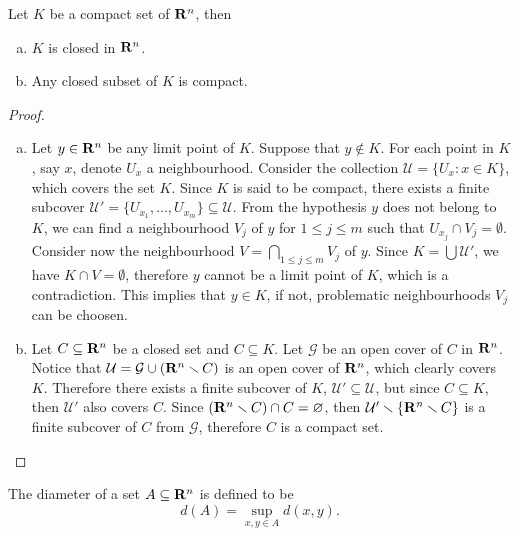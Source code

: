\begin{proposition}\label{prop: compact-close}
Let \(K\) be a compact set of \(\mathbf{R}^n\), then
\begin{enumerate}[(a)]
\item \(K\) is closed in \(\mathbf{R}^n\).
\item Any closed subset of \(K\) is compact.
\end{enumerate}
\end{proposition}

\begin{proof}
\begin{enumerate}[(a)]
\item Let \(y \in \mathbf{R}^n\) be any limit point of \(K\). Suppose that \(y
    \not\in K\). For each point in \(K\), say \(x\), denote \(U_x\) a
    neighbourhood. Consider the collection \(\mathcal U = \{U_x: x \in K\}\),
    which covers the set \(K\). Since \(K\) is said to be compact, there
    exists a finite subcover \(\mathcal U' = \{U_{x_1}, \dots, U_{x_m}\}
    \subseteq \mathcal U\). From the hypothesis \(y\) does not belong to
    \(K\), we can find a neighbourhood \(V_j\) of \(y\) for \(1 \leq j \leq
    m\) such that \(U_{x_j} \cap V_j = \emptyset\). Consider now the
    neighbourhood \(V = \bigcap_{1 \leq j \leq m} V_j\) of \(y\). Since \(K =
    \bigcup \mathcal U'\), we have \(K \cap V = \emptyset\), therefore \(y\)
    cannot be a limit point of \(K\), which is a contradiction. This implies
    that \(y \in K\), if not, problematic neighbourhoods \(V_j\) can be
    choosen.
\item Let \(C \subseteq \mathbf{R}^n\) be a closed set and \(C \subseteq K\). Let
    \(\mathcal G\) be an open cover of \(C\) in \(\mathbf{R}^n\). Notice that
    \(\mathcal U = \mathcal G \cup (\mathbf{R}^n \smallsetminus C)\) is an open cover of
    \(\mathbf{R}^n\), which clearly covers \(K\). Therefore there exists a finite
    subcover of \(K\), \(\mathcal U' \subseteq \mathcal U\), but since \(C
    \subseteq K\), then \(\mathcal U'\) also covers \(C\). Since \((\mathbf{R}^n
    \smallsetminus C) \cap C = \varnothing\), then \(\mathcal U' \smallsetminus \{\mathbf{R}^n
    \smallsetminus C\}\) is a finite subcover of \(C\) from \(\mathcal G\),
    therefore \(C\) is a compact set.
\end{enumerate}
\end{proof}

\begin{definition}\label{def:Rn-diameter}
The diameter of a set \(A \subseteq \mathbf{R}^n\) is defined to be
\[
d(A) = \sup_{x, y \in A} d(x, y).
\]
\end{definition}

